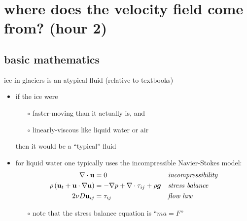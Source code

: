 \documentclass[10pt,dvipsnames]{beamer}
\begin{document}
\section[where does the velocity field come from?]{\textbf{where does the velocity field come from?} (hour 2)}

\subsection{basic mathematics}

\begin{frame}{ice in glaciers is an atypical fluid (relative to textbooks)}

\begin{itemize}
\item if the ice were
  \begin{itemize}
  \item[$\circ$] faster-moving than it actually is, and
  \item[$\circ$] linearly-viscous like liquid water or air
  \end{itemize}

  then it would be a ``typical'' fluid

\bigskip
\item for liquid water one typically uses the incompressible Navier-Stokes model:
\begin{align*}
\nabla \cdot \mathbf{u} &= 0 &&\text{\emph{incompressibility}} \\
\rho \left(\mathbf{u}_t + \mathbf{u}\cdot\nabla \mathbf{u}\right) &= -\nabla p + \nabla \cdot \tau_{ij} + \rho \bm{g} &&\text{\emph{stress balance}} \\
2 \nu D\mathbf{u}_{ij} &= \tau_{ij} &&\text{\emph{flow law}}
\end{align*}

\medskip
    \begin{itemize}
    \item[$\circ$] note that the stress balance equation is ``$m a = F$''
    \end{itemize}
\end{itemize}
\end{frame}
\end{document}
